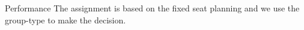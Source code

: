   \begin{frame}{Performance}
    \scriptsize
    The assignment is based on the fixed seat planning and we use the group-type to make the decision. 


\end{frame}
